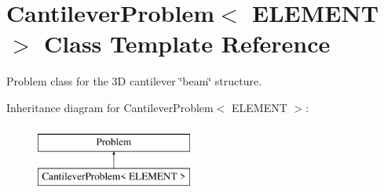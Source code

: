 \hypertarget{classCantileverProblem}{}\section{Cantilever\+Problem$<$ E\+L\+E\+M\+E\+NT $>$ Class Template Reference}
\label{classCantileverProblem}


Problem class for the 3D cantilever \char`\"{}beam\char`\"{} structure.  


Inheritance diagram for Cantilever\+Problem$<$ E\+L\+E\+M\+E\+NT $>$\+:\begin{figure}[H]
\begin{center}
\leavevmode
\includegraphics[height=2.000000cm]{classCantileverProblem}
\end{center}
\end{figure}
